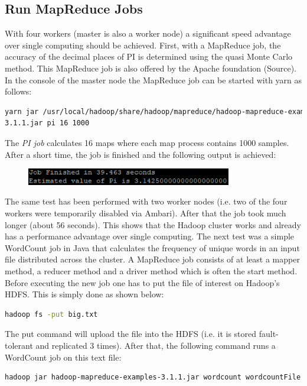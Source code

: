\subsection{Run MapReduce Jobs}
With four workers (master is also a worker node) a significant speed advantage over single computing should be achieved. First, with a MapReduce job, the accuracy of the decimal places of PI is determined using the quasi Monte Carlo method. This MapReduce job is also offered by the Apache foundation (Source). In the console of the master node the MapReduce job can be started with \acs{yarn} as
follows:
\begin{lstlisting}[language=bash,breaklines=true]
yarn jar /usr/local/hadoop/share/hadoop/mapreduce/hadoop-mapreduce-examples-
3.1.1.jar pi 16 1000
\end{lstlisting}
The \emph{PI job} calculates 16 maps where each map process contains 1000 samples. After a short time, the job is finished and the following output is achieved:
\begin{figure}[H]
\hspace{1.2cm}
\includegraphics[width=0.8\textwidth]{img/job}
\label{pic:job}
\end{figure}
\noindent The same test has been performed with two worker nodes (i.e. two of the four workers were temporarily disabled via Ambari). After that the job took much longer (about 56 seconds). This shows that the Hadoop cluster works and already has a performance advantage over single computing. The next test was a simple WordCount job in Java that calculates the frequency of unique words in an input file distributed across the cluster. A MapReduce job consists of at least a mapper method, a reducer method and a driver method which is often the start method. Before executing the new job one has to put the file of interest on Hadoop’s HDFS. This is simply done as shown below:
\begin{lstlisting}[language=bash,breaklines=true]
hadoop fs -put big.txt
\end{lstlisting}
The put command will upload the file into the HDFS (i.e. it is stored fault-tolerant and replicated 3 times). After that, the following command runs a WordCount job on this text file:
\begin{lstlisting}[language=bash,breaklines=true]
hadoop jar hadoop-mapreduce-examples-3.1.1.jar wordcount wordcountFile big.txt
\end{lstlisting}

